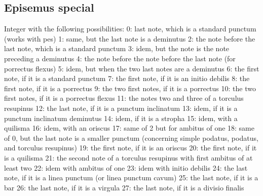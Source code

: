 \subsection{Episemus special}
Integer with the following possibilities:
    0: last note, which is a standard punctum (works with pes)
    1: same, but the last note is a deminutus
    2: the note before the last note, which is a standard punctum
    3: idem, but the note is the note preceding a deminutus
    4: the note before the note before the last note (for porrectus flexus)
    5: idem, but when the two last notes are a deminutus
    6: the first note, if it is a standard punctum
    7: the first note, if it is an initio debilis
    8: the first note, if it is a porrectus
    9: the two first notes, if it is a porrectus
    10: the two first notes, if it is a porrectus flexus
    11: the notes two and three of a torculus resupinus
    12: the last note, if it is a punctum inclinatum
    13: idem, if it is a punctum inclinatum deminutus
    14: idem, if it is a stropha
    15: idem, with a quilisma
    16: idem, with an oriscus
    17: same of 2 but for ambitus of one
    18: same of 0, but the last note is a smaller punctum (concerning simple podatus, podatus, and torculus resupinus)
    19: the first note, if it is an oriscus
    20: the first note, if it is a quilisma
    21: the second note of a torculus resupinus with first ambitus of at least two
    22: idem with ambitus of one
    23: idem with initio debilis
    24: the last note, if it is a linea punctum (or linea punctum cavum)
    25: the last note, if it is a bar
    26: the last note, if it is a virgula
    27: the last note, if it is a divisio finalis

